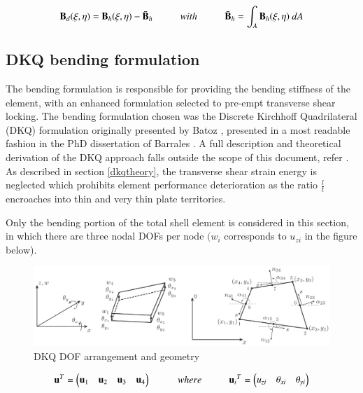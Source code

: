 \begin{equation} 
\mathbf{B}_d(\xi,\eta) = \mathbf{B}_h(\xi,\eta) - \bar{\mathbf{B}}_h
\hspace{10mm}
with
\hspace{10mm}
\bar{\mathbf{B}}_h = \int_A \mathbf{B}_h(\xi,\eta) \ dA
\label{eqnAndesDevB}
\end{equation}

\subsection{DKQ bending formulation}
\label{section:DKQ bending formulation}

The bending formulation is responsible for providing the bending stiffness of the element, with an enhanced formulation selected to pre-empt transverse shear locking. The bending formulation chosen was the Discrete Kirchhoff Quadrilateral (DKQ) formulation  originally presented by Batoz \cite{Bat82}, presented in a most readable fashion in the PhD dissertation of Barrales \cite{Bar12}. A full description and theoretical derivation of the DKQ approach falls outside the scope of this document, refer \cite{Bat82}. As described in section \ref{dkqtheory}, the transverse shear strain energy is neglected which prohibits element performance deterioration as the ratio $\frac{l}{t}$ encroaches into thin and very thin plate territories.

Only the bending portion of the total shell element is considered in this section, in which there are three nodal DOFs per node $(w_i$ corresponds to $u_{zi}$ in the figure below).

\begin{figure}[H]
	\centering
	\def\svgwidth{\columnwidth}
	\includegraphics[width=15cm]{images/8nodeseren.png}
	\caption{DKQ DOF arrangement and geometry \cite{Bar12}}
	\label{8nodeseren}
\end{figure}

\begin{equation} 
\mathbf{u}^T = 
\begin{pmatrix}
\mathbf{u}_1 & \mathbf{u}_2 & \mathbf{u}_3 & \mathbf{u}_4
\end{pmatrix} 
\hspace{10mm}
where
\hspace{10mm}
\mathbf{u}{_i}^T = 
\begin{pmatrix}
{u_{zi}} & {\theta_{xi}} & {\theta_{yi}}
\end{pmatrix}
\label{equationBending}
\end{equation}

